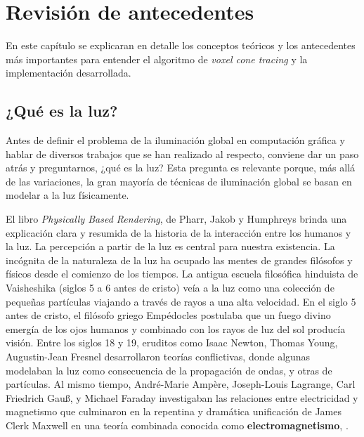 \graphicspath{{chapters/2_antecedentes/figures/}}

\chapter{Revisión de antecedentes}


En este capítulo se explicaran en detalle los conceptos teóricos y los antecedentes más importantes para entender el algoritmo de \textit{voxel cone tracing} y la implementación desarrollada.

\section{¿Qué es la luz?}

Antes de definir el problema de la iluminación global en computación gráfica y hablar de diversos trabajos que se han realizado al respecto, conviene dar un paso atrás y preguntarnos, ¿qué es la luz?
Esta pregunta es relevante porque, más allá de las variaciones, la gran mayoría de técnicas de iluminación global se basan en modelar a la luz físicamente.

El libro \textit{Physically Based Rendering}, de Pharr, Jakob y Humphreys \cite{pbr} brinda una explicación clara y resumida de la historia de la interacción entre los humanos y la luz.
La percepción a partir de la luz es central para nuestra existencia.
La incógnita de la naturaleza de la luz ha ocupado las mentes de grandes filósofos y físicos desde el comienzo de los tiempos.
La antigua escuela filosófica hinduista de Vaisheshika (siglos 5 a 6 antes de cristo) veía a la luz como una colección de pequeñas partículas viajando a través de rayos a una alta velocidad.
En el siglo 5 antes de cristo, el filósofo griego Empédocles postulaba que un fuego divino emergía de los ojos humanos y combinado con los rayos de luz del sol producía visión.
Entre los siglos 18 y 19, eruditos como Isaac Newton, Thomas Young, Augustin-Jean Fresnel desarrollaron teorías conflictivas, donde algunas modelaban la luz como consecuencia de la propagación de ondas, y otras de partículas.
Al mismo tiempo, André-Marie Ampère, Joseph-Louis Lagrange, Carl Friedrich Gauß, y Michael Faraday investigaban las relaciones entre electricidad y magnetismo que culminaron en la repentina y dramática unificación de James Clerk Maxwell en una teoría combinada conocida como \textbf{electromagnetismo}, \cite{maxwell-equations}.

